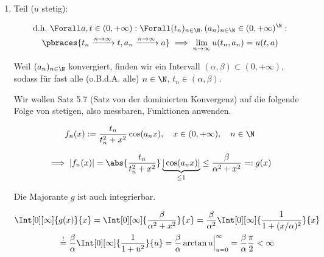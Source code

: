 \begin{solution}

\phantom{}

\begin{enumerate}[label = \arabic*.]

    \item Teil ($u$ stetig):
    
    \begin{multline*}
        \text{d.h.}~
        \Forall a, t \in (0, +\infty):
        \Forall (t_n)_{n \in \N}, (a_n)_{n \in \N} \in (0, +\infty)^\N: \\
        \pbraces
        {
            t_n \xrightarrow{n \to \infty} t,
            a_n \xrightarrow{n \to \infty} a
        }
        \implies
        \lim_{n \to \infty} u(t_n, a_n) = u(t, a)
    \end{multline*}

    Weil $(a_n)_{n \in \N}$ konvergiert, finden wir ein Intervall $(\alpha, \beta) \subset (0, +\infty)$, sodass für fast alle (o.B.d.A. alle) $n \in \N$, $t_n \in (\alpha, \beta)$.


    Wir wollen Satz 5.7 (Satz von der dominierten Konvergenz) auf die folgende Folge von stetigen, also messbaren, Funktionen anwenden.

    \begin{align*}
        f_n(x)
        :=
        \frac{t_n}{t_n^2 + x^2}
        \cos(a_n x),
        \quad
        x \in (0, +\infty),
        \quad
        n \in \N
    \end{align*}

    \begin{align*}
        \implies
        |f_n(x)|
        =
        \abs
        {
            \frac{t_n}{t_n^2 + x^2}
        }
        \underbrace
        {
            |\cos(a_n x)|
        }_{
            \leq 1
        }
        \leq
        \frac{\beta}{\alpha^2 + x^2}
        =:
        g(x)
    \end{align*}

    Die Majorante $g$ ist auch integrierbar.

    \begin{multline*}
        \Int[0][\infty]{g(x)}{x}
        =
        \Int[0][\infty]
        {
            \frac{\beta}{\alpha^2 + x^2}
        }{x}
        =
        \frac{\beta}{\alpha^2}
        \Int[0][\infty]
        {
            \frac{1}{1 + (x / \alpha)^2}
        }{x} \\
        \stackrel{!}{=}
        \frac{\beta}{\alpha}
        \Int[0][\infty]{\frac{1}{1 + u^2}}{u}
        =
        \frac{\beta}{\alpha}
        \arctan u \Big |_{u=0}^\infty
        =
        \frac{\beta}{\alpha}
        \frac{\pi}{2}
        <
        \infty
    \end{multline*}


\end{enumerate}
\end{solution}
